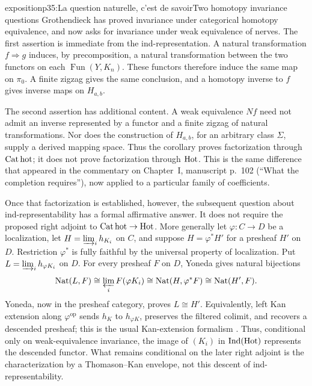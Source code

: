 \begin{dcomment}{exposition}{p35:La question naturelle, c'est de savoir}{Two homotopy invariance questions}
Grothendieck has proved invariance under categorical homotopy equivalence, and now asks for invariance under weak equivalence of nerves. The first assertion is immediate from the ind-representation. A natural transformation $f\Rightarrow g$ induces, by precomposition, a natural transformation between the two functors on each $\operatorname{Fun}(Y,K_n)$. These functors therefore induce the same map on $\pi_0$. A finite zigzag gives the same conclusion, and a homotopy inverse to $f$ gives inverse maps on $H_{a,b}$.

The second assertion has additional content. A weak equivalence $Nf$ need not admit an inverse represented by a functor and a finite zigzag of natural transformations. Nor does the construction of $H_{a,b}$, for an arbitrary class $\Sigma$, supply a derived mapping space. Thus the corollary proves factorization through $\mathrm{Cat\,hot}$; it does not prove factorization through $\mathrm{Hot}$. This is the same difference that appeared in the commentary on Chapter~I, manuscript p.~102 (``What the completion requires''), now applied to a particular family of coefficients.

Once that factorization is established, however, the subsequent question about ind-representability has a formal affirmative answer. It does not require the proposed right adjoint to $\mathrm{Cat\,hot}\to\mathrm{Hot}$. More generally let $\varphi:C\to D$ be a localization, let $H=\varinjlim_i h_{K_i}$ on $C$, and suppose $H=\varphi^*H'$ for a presheaf $H'$ on $D$. Restriction $\varphi^*$ is fully faithful by the universal property of localization. Put $L=\varinjlim_i h_{\varphi K_i}$ on $D$. For every presheaf $F$ on $D$, Yoneda gives natural bijections
\[
 \operatorname{Nat}(L,F)
 \cong\varprojlim_i F(\varphi K_i)
 \cong\operatorname{Nat}(H,\varphi^*F)
 \cong\operatorname{Nat}(H',F).
\]
Yoneda, now in the presheaf category, proves $L\cong H'$. Equivalently, left Kan extension along $\varphi^{\mathrm{op}}$ sends $h_K$ to $h_{\varphi K}$, preserves the filtered colimit, and recovers a descended presheaf; this is the usual Kan-extension formalism \citep[\S\S1.1--1.4]{Riehl2014}. Thus, conditional only on weak-equivalence invariance, the image of $(K_i)$ in $\operatorname{Ind}(\mathrm{Hot})$ represents the descended functor. What remains conditional on the later right adjoint is the characterization by a Thomason--Kan envelope, not this descent of ind-representability.


\end{dcomment}
